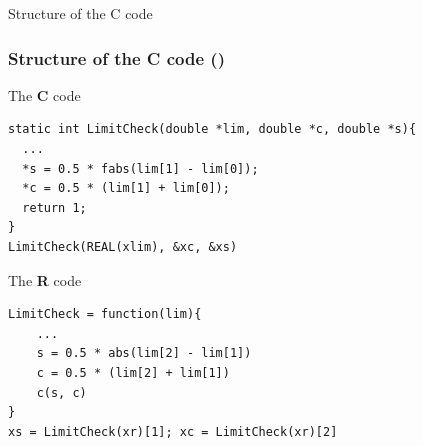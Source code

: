 \documentclass{beamer}
\begin{document}






\begin{frame}[fragile]
\begin{center}
\Huge Structure of the C code
\end{center}
\end{frame}


\begin{frame}[fragile]
\frametitle{Structure of the \textbf{C} code ()}





\begin{block}{The \textbf{C} code}
\begin{lstlisting}[basicstyle=\ttfamily\scriptsize]
static int LimitCheck(double *lim, double *c, double *s){
  ...
  *s = 0.5 * fabs(lim[1] - lim[0]);
  *c = 0.5 * (lim[1] + lim[0]);
  return 1;
}
LimitCheck(REAL(xlim), &xc, &xs)
\end{lstlisting}
\end{block}


\begin{block}{The \textbf{R} code}
\begin{lstlisting}[basicstyle=\ttfamily\scriptsize]
LimitCheck = function(lim){
    ...
    s = 0.5 * abs(lim[2] - lim[1])
    c = 0.5 * (lim[2] + lim[1])
    c(s, c)
}
xs = LimitCheck(xr)[1]; xc = LimitCheck(xr)[2]
\end{lstlisting}
\end{block}

\end{frame}
\end{document}
